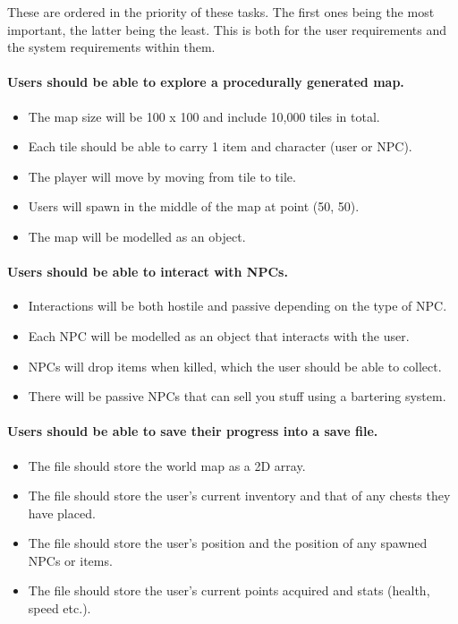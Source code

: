 \documentclass{article}
\begin{document}
These are ordered in the priority of these tasks. The first ones being the most
important, the latter being the least. This is both for the user requirements
and the system requirements within them.

\paragraph{Users should be able to explore a procedurally generated map.}
\begin{itemize}
	\item The map size will be 100 x 100 and include 10,000 tiles in total.
	\item Each tile should be able to carry 1 item and character (user or NPC).
	\item The player will move by moving from tile to tile.
	\item Users will spawn in the middle of the map at point (50, 50).
	\item The map will be modelled as an object.
\end{itemize}

\paragraph{ Users should be able to interact with NPCs.}
\begin{itemize}
	\item Interactions will be both hostile and passive depending on the type of NPC.
	\item Each NPC will be modelled as an object that interacts with the user.
	\item NPCs will drop items when killed, which the user should be able to collect.
	\item There will be passive NPCs that can sell you stuff using a bartering system.
\end{itemize}

\paragraph{Users should be able to save their progress into a save file.}
\begin{itemize}
	\item The file should store the world map as a 2D array.
	\item The file should store the user’s current inventory and that of any chests they have placed.
	\item The file should store the user’s position and the position of any spawned NPCs or items.
	\item The file should store the user’s current points acquired and stats (health, speed etc.).
\end{itemize}
\end{document}
